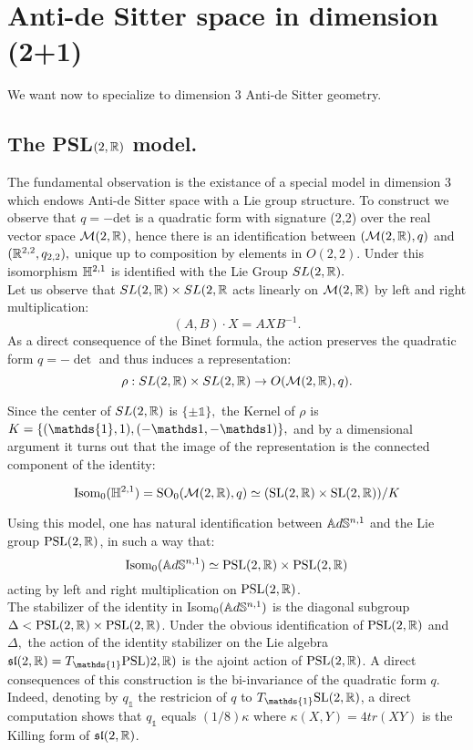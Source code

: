\chapter{Anti-de Sitter space in dimension (2+1)}
We want now to specialize to dimension 3 Anti-de Sitter geometry. 
\section{The {PSL}$(2,\mathbb{R})$ model.} The fundamental observation is the existance of a special model in dimension 3 which endows Anti-de Sitter space with a Lie group structure. To construct we observe that $q=-$det is a quadratic form with signature (2,2) over the real vector space $\mathcal{M}(2,\mathbb{R})$, hence there is an identification between $(\mathcal{M}(2,\mathbb{R}),q)$ and $(\mathbb{R}^{2,2}, q_{2,2}),$ unique up to composition by elements in $O(2,2)$. Under this isomorphism $\mathbb{H}^{2,1}$ is identified with the Lie Group $SL(2,\mathbb{R}).$\\
Let us observe that $SL(2,\mathbb{R})\times SL(2,\mathbb{R}$ acts linearly on $\mathcal{M}(2,\mathbb{R})$ by left and right multiplication:
\[
    (A,B)\cdot X=AXB^{-1}.
\]
As a direct consequence of the Binet formula, the action preserves the quadratic form $q=-\det$ and thus induces a representation: 
\[ 
    \rho:SL(2,\mathbb{R})\times SL(2,\mathbb{R})\to O(\mathcal{M}(2,\mathbb{R}),q).    
\]

Since the center of $SL(2,\mathbb{R})$ is $\{\pm \mathds{1}\},$ the Kernel of $\rho$ is $K=\{(\mathds{1},1),(-\1,-\1)\},$ and by a dimensional argument it turns out that the image of the representation is the connected component of the identity:

\[
    \text{Isom}_0(\mathbb{H}^{2,1})=\text{SO}_0(\mathcal{M}(2,\mathbb{R}),q)\simeq (\text{SL}(2,\mathbb{R})\times \text{SL}(2,\mathbb{R}))/K
\]

Using this model, one has natural identification between $\mathbb{A}d\mathbb{S}^{n,1}$ and the Lie group $\text{PSL}(2,\mathbb{R})$, in such a way that: 
\[
    \text{Isom}_0(\mathbb{A}d\mathbb{S}^{n,1})\simeq \text{PSL}(2,\mathbb{R})\times\text{PSL}(2,\mathbb{R})
\]
acting by left and right multiplication on $\text{PSL}(2,\mathbb{R})$.\\
The stabilizer of the identity in Isom$_0(\mathbb{A}d\mathbb{S}^{n,1})$ is the diagonal subgroup $\Delta<\text{PSL}(2,\mathbb{R})\times\text{PSL}(2,\mathbb{R})$. Under the obvious identification of $\text{PSL}(2,\mathbb{R})$ and $\Delta,$ the action of the identity stabilizer on the Lie algebra $\mathfrak{sl}(2,\R)=T_{\mathds{1}}\text{PSL})2,\R)$ is the ajoint action of $\text{PSL}(2,\mathbb{R})$. A direct consequences of this construction is the bi-invariance of the quadratic form $q$. Indeed, denoting by $q_{\mathds{1}}$ the restricion of $q$ to $T_{\mathds{1}}\text{SL}(2,\R)$, a direct computation shows that $q_\mathds{1}$ equals $(1/8)\kappa$ where $\kappa(X,Y)=4tr(XY)$ is the Killing form of $\mathfrak{sl}(2, \mathbb{R})$.

